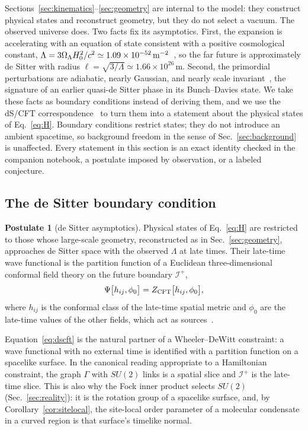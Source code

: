 \documentclass[reprint,aps,prd,amsmath,amssymb,superscriptaddress,nofootinbib,floatfix]{revtex4-2}
\theoremstyle{plain}
\theoremstyle{definition}
\newtheorem{postulate}{Postulate}
\theoremstyle{remark}
\newcommand{\SU}{SU(2)}
\begin{document}
Sections~\ref{sec:kinematics}--\ref{sec:geometry} are internal to the model: they construct physical states and
reconstruct geometry, but they do not select a vacuum. The observed universe does. Two facts fix its
asymptotics. First, the expansion is accelerating with an equation of state consistent with a positive
cosmological constant, $\Lambda=3\Omega_\Lambda H_0^2/c^2\simeq1.09\times10^{-52}\,{\rm m}^{-2}$~\cite{Planck2018params}, so the far
future is approximately de Sitter with radius $\ell=\sqrt{3/\Lambda}\simeq1.66\times10^{26}$\,m. Second, the primordial
perturbations are adiabatic, nearly Gaussian, and nearly scale invariant~\cite{Planck2018,Planck2018NG}, the signature
of an earlier quasi-de Sitter phase in its Bunch--Davies state. We take these facts as boundary conditions
instead of deriving them, and we use the dS/CFT correspondence~\cite{Strominger2001,Witten2001,Maldacena2003} to turn
them into a statement about the physical states of Eq.~\eqref{eq:H}. Boundary conditions restrict states; they do
not introduce an ambient spacetime, so background freedom in the sense of Sec.~\ref{sec:background} is unaffected.
Every statement in this section is an exact identity checked in the companion notebook, a postulate imposed by
observation, or a labeled conjecture.

\subsection{The de Sitter boundary condition}

\begin{postulate}[de Sitter asymptotics]
\label{post:ds}
Physical states of Eq.~\eqref{eq:H} are restricted to those whose large-scale geometry, reconstructed as in
Sec.~\ref{sec:geometry}, approaches de Sitter space with the observed $\Lambda$ at late times. Their late-time wave
functional is the partition function of a Euclidean three-dimensional conformal field theory on the future
boundary $\mathcal{I}^+$,
\begin{equation}
\Psi\big[h_{ij},\phi_0\big]=Z_{\rm CFT}\big[h_{ij},\phi_0\big],
\label{eq:dscft}
\end{equation}
where $h_{ij}$ is the conformal class of the late-time spatial metric and $\phi_0$ are the late-time values of the
other fields, which act as sources~\cite{Maldacena2003}.
\end{postulate}

Equation~\eqref{eq:dscft} is the natural partner of a Wheeler--DeWitt constraint: a wave functional with no external
time is identified with a partition function on a spacelike surface. In the canonical reading appropriate to a
Hamiltonian constraint, the graph $\Gamma$ with $\SU$ links is a spatial slice and $\mathcal{I}^+$ is the late-time slice.
This is also why the Fock inner product selects $\SU$ (Sec.~\ref{sec:reality}): it is the rotation group of a
spacelike surface, and, by Corollary~\ref{cor:sitelocal}, the site-local order parameter of a molecular condensate in a
curved region is that surface's timelike normal.
\end{document}
